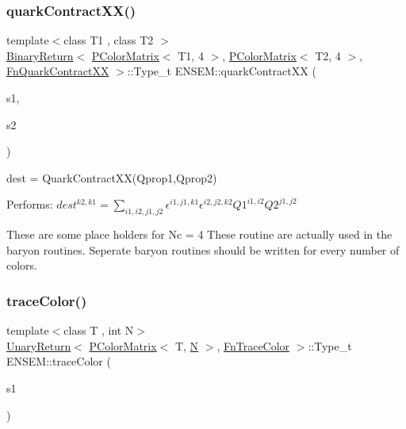 \subsubsection{\texorpdfstring{quarkContractXX()}{quarkContractXX()}\hspace{0.1cm}{\footnotesize\ttfamily [4/4]}}
{\footnotesize\ttfamily template$<$class T1 , class T2 $>$ \\
\mbox{\hyperlink{structENSEM_1_1BinaryReturn}{Binary\+Return}}$<$ \mbox{\hyperlink{classENSEM_1_1PColorMatrix}{P\+Color\+Matrix}}$<$ T1, 4 $>$, \mbox{\hyperlink{classENSEM_1_1PColorMatrix}{P\+Color\+Matrix}}$<$ T2, 4 $>$, \mbox{\hyperlink{structENSEM_1_1FnQuarkContractXX}{Fn\+Quark\+Contract\+XX}} $>$\+::Type\+\_\+t E\+N\+S\+E\+M\+::quark\+Contract\+XX (\begin{DoxyParamCaption}\item[{const \mbox{\hyperlink{classENSEM_1_1PColorMatrix}{P\+Color\+Matrix}}$<$ T1, 4 $>$ \&}]{s1,  }\item[{const \mbox{\hyperlink{classENSEM_1_1PColorMatrix}{P\+Color\+Matrix}}$<$ T2, 4 $>$ \&}]{s2 }\end{DoxyParamCaption})\hspace{0.3cm}{\ttfamily [inline]}}



dest = Quark\+Contract\+X\+X(\+Qprop1,\+Qprop2) 

Performs\+: $dest^{k2,k1} = \sum_{i1,i2,j1,j2} \epsilon^{i1,j1,k1}\epsilon^{i2,j2,k2} Q1^{i1,i2} Q2^{j1,j2}$

These are some place holders for Nc = 4 These routine are actually used in the baryon routines. Seperate baryon routines should be written for every number of colors. \mbox{\label{group__primcolormatrix_ga00fd94578bee0c90e298c41c144c15ee}} 
\subsubsection{\texorpdfstring{traceColor()}{traceColor()}}
{\footnotesize\ttfamily template$<$class T , int N$>$ \\
\mbox{\hyperlink{structENSEM_1_1UnaryReturn}{Unary\+Return}}$<$ \mbox{\hyperlink{classENSEM_1_1PColorMatrix}{P\+Color\+Matrix}}$<$ T, \mbox{\hyperlink{operator__name__util_8cc_a7722c8ecbb62d99aee7ce68b1752f337}{N}} $>$, \mbox{\hyperlink{structENSEM_1_1FnTraceColor}{Fn\+Trace\+Color}} $>$\+::Type\+\_\+t E\+N\+S\+E\+M\+::trace\+Color (\begin{DoxyParamCaption}\item[{const \mbox{\hyperlink{classENSEM_1_1PColorMatrix}{P\+Color\+Matrix}}$<$ T, \mbox{\hyperlink{operator__name__util_8cc_a7722c8ecbb62d99aee7ce68b1752f337}{N}} $>$ \&}]{s1 }\end{DoxyParamCaption})\hspace{0.3cm}{\ttfamily [inline]}}

